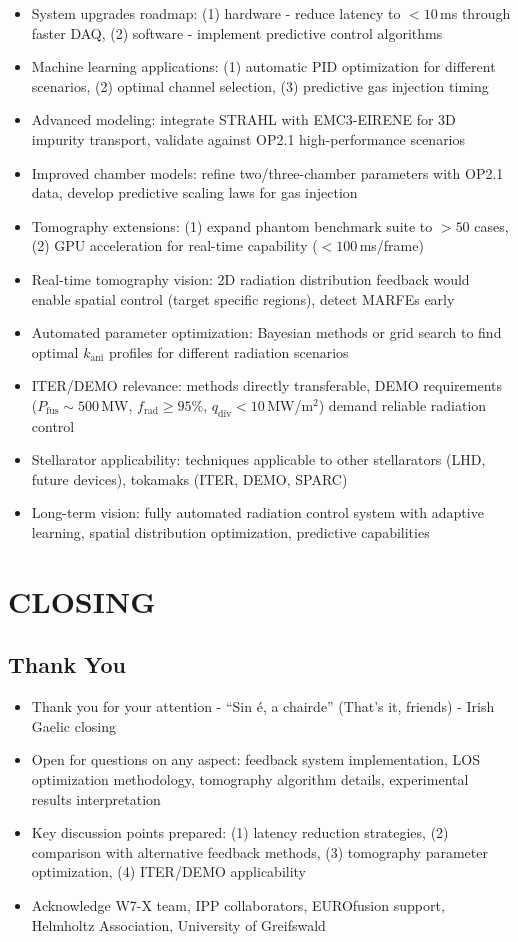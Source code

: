 \documentclass[11pt,a4paper]{article}
\begin{document}
\begin{itemize}
\item System upgrades roadmap: (1) hardware - reduce latency to $<10$\,ms through faster DAQ, (2) software - implement predictive control algorithms
\item Machine learning applications: (1) automatic PID optimization for different scenarios, (2) optimal channel selection, (3) predictive gas injection timing
\item Advanced modeling: integrate STRAHL with EMC3-EIRENE for 3D impurity transport, validate against OP2.1 high-performance scenarios
\item Improved chamber models: refine two/three-chamber parameters with OP2.1 data, develop predictive scaling laws for gas injection
\item Tomography extensions: (1) expand phantom benchmark suite to $>50$ cases, (2) GPU acceleration for real-time capability ($<100$\,ms/frame)
\item Real-time tomography vision: 2D radiation distribution feedback would enable spatial control (target specific regions), detect MARFEs early
\item Automated parameter optimization: Bayesian methods or grid search to find optimal $k_{\text{ani}}$ profiles for different radiation scenarios
\item ITER/DEMO relevance: methods directly transferable, DEMO requirements ($P_{\text{fus}}\sim500$\,MW, $f_{\text{rad}}\geq95\%$, $q_{\text{div}}<10$\,MW/m$^2$) demand reliable radiation control
\item Stellarator applicability: techniques applicable to other stellarators (LHD, future devices), tokamaks (ITER, DEMO, SPARC)
\item Long-term vision: fully automated radiation control system with adaptive learning, spatial distribution optimization, predictive capabilities
\end{itemize}

\section{CLOSING}

\subsection{Thank You}

\begin{itemize}
\item Thank you for your attention - ``Sin é, a chairde'' (That's it, friends) - Irish Gaelic closing
\item Open for questions on any aspect: feedback system implementation, LOS optimization methodology, tomography algorithm details, experimental results interpretation
\item Key discussion points prepared: (1) latency reduction strategies, (2) comparison with alternative feedback methods, (3) tomography parameter optimization, (4) ITER/DEMO applicability
\item Acknowledge W7-X team, IPP collaborators, EUROfusion support, Helmholtz Association, University of Greifswald
\end{itemize}
\end{document}
